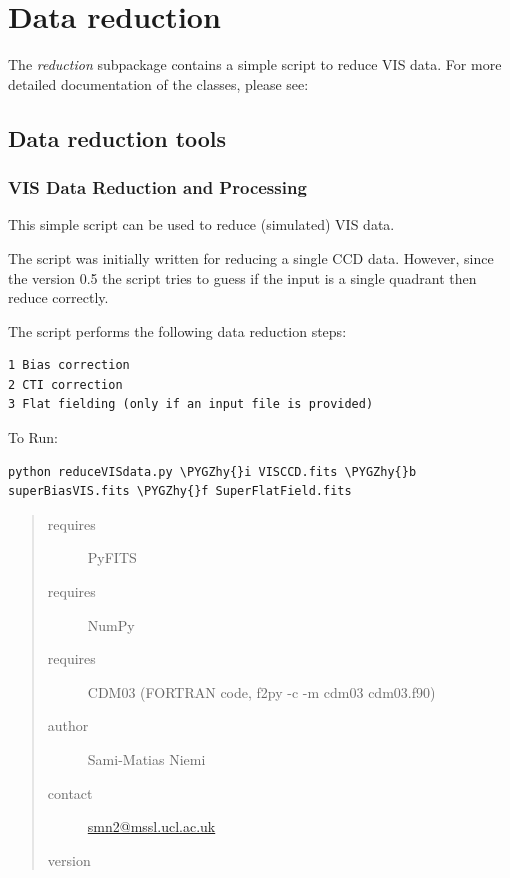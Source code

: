 \documentclass[a4paper,11pt,english]{sphinxmanual}
\def\PYGZhy{\char`\-}
\begin{document}
\chapter{Data reduction}
\label{index:data-reduction}
The \emph{reduction} subpackage contains a simple script to reduce VIS data. For more detailed documentation
of the classes, please see:


\section{Data reduction tools}
\label{reduction:module-reduction.reduceVISdata}\label{reduction::doc}\label{reduction:data-reduction-tools}

\subsection{VIS Data Reduction and Processing}
\label{reduction:vis-data-reduction-and-processing}
This simple script can be used to reduce (simulated) VIS data.

The script was initially written for reducing a single CCD data.
However, since the version 0.5 the script tries to guess if the
input is a single quadrant then reduce correctly.

The script performs the following data reduction steps:

\begin{Verbatim}[commandchars=\\\{\}]
1 Bias correction
2 CTI correction
3 Flat fielding (only if an input file is provided)
\end{Verbatim}

To Run:

\begin{Verbatim}[commandchars=\\\{\}]
python reduceVISdata.py \PYGZhy{}i VISCCD.fits \PYGZhy{}b superBiasVIS.fits \PYGZhy{}f SuperFlatField.fits
\end{Verbatim}
\begin{quote}\begin{description}
\item[{requires}] \leavevmode
PyFITS

\item[{requires}] \leavevmode
NumPy

\item[{requires}] \leavevmode
CDM03 (FORTRAN code, f2py -c -m cdm03 cdm03.f90)

\item[{author}] \leavevmode
Sami-Matias Niemi

\item[{contact}] \leavevmode
\href{mailto:smn2@mssl.ucl.ac.uk}{smn2@mssl.ucl.ac.uk}

\item[{version}] 

\end{description}\end{quote}
\end{document}
